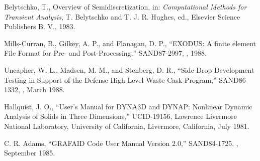 \begin{thebibliography}{99}
\frenchspacing

 Belytschko, T., Overview of Semidiscretization, in: {\it
Computational Methods for Transient Analysis}, T. Belytschko and T. J.
R. Hughes, ed., Elsevier Science Publishers B. V., 1983.

 Mills-Curran, B., Gilkey, A. P., and Flanagan, D. P.,
``EXODUS: A finite element File Format for Pre- and Post-Processing,''
 SAND87-2997, \SANDIA, 1988.

 Uncapher, W. L., Madsen, M. M., and Stenberg, D. R.,
``Side-Drop Development Testing in Support of the Defense High Level 
Waste Cask Program,'' SAND86-1332, \SANDIA, March 1988.

 Hallquist, J. O., 
``User's Manual for DYNA3D and DYNAP: Nonlinear
Dynamic Analysis of Solids in Three Dimensions,'' UCID-19156, Lawrence
Livermore National Laboratory, University of California, Livermore,
California, July 1981.

  C. R. Adams, 
``GRAFAID Code User Manual Version 2.0,'' SAND84-1725, \SANDIA,
September 1985.

\end{thebibliography}
